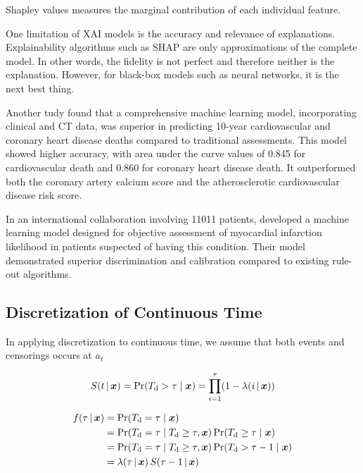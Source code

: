 Shapley values measures the marginal contribution
of each individual feature.


One limitation of XAI models is the accuracy and relevance of explanations.
Explainability algorithms such as SHAP are only approximations
of the complete model.
In other words, the fidelity is not perfect and therefore neither
is the explanation.
However, for black-box models such as neural networks,
it is the next best thing.

Another tudy found that a comprehensive machine learning model, incorporating
clinical and CT data, was superior in predicting 10-year cardiovascular and
coronary heart disease deaths compared to traditional assessments. This model
showed higher accuracy, with area under the curve values of 0.845 for
cardiovascular death and 0.860 for coronary heart disease death. It
outperformed both the coronary artery calcium score and the atherosclerotic
cardiovascular disease risk score.
~\autocite{nakanishiMachine2021}

In an international collaboration involving \num{11011} patients, \citeauthor{thanMachine2019} developed a machine learning model 
designed for objective assessment of myocardial infarction likelihood 
in patients suspected of having this condition. 
Their model demonstrated superior discrimination and calibration 
compared to existing rule-out algorithms.
~\autocite{thanMachine2019}


\subsection{Discretization of Continuous Time}

In applying discretization to continuous time, 
we assume that both events and censorings occurs at 
\(a_t\)


\begin{equation}
    S(t \,|\, \bm{x}) = \operatorname{\Pr}({T_{\mathrm{d}}} > \tau \mid \bm{x}) = 
    \prod_{i=1}^{\tau} (1 - \lambda(i \,|\, \bm{x}))
\end{equation}

\begin{equation}
    \begin{aligned}
    f(\tau \,|\, \bm{x}) 
    &= \operatorname{\Pr} ({T_{\mathrm{d}}} = \tau \mid \bm{x}) \\
    &= \operatorname{\Pr} ({T_{\mathrm{d}}} = \tau \mid {T_{\mathrm{d}}} \geq \tau, \bm{x}) 
       \operatorname{\Pr} ({T_{\mathrm{d}}}  \geq \tau \mid \bm{x}) \\
    &= \operatorname{\Pr} ({T_{\mathrm{d}}} = \tau \mid {T_{\mathrm{d}}} \geq \tau, \bm{x}) 
       \operatorname{\Pr} ({T_{\mathrm{d}}}  > \tau - 1 \mid \bm{x}) \\
    &= \lambda (\tau \,|\, \bm{x}) \, S(\tau - 1 \,|\, \bm{x})
    \end{aligned}
\end{equation}

